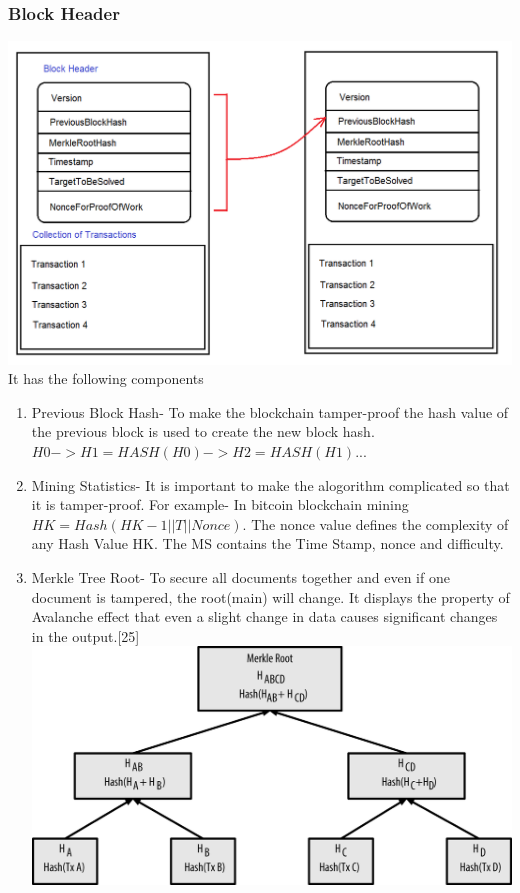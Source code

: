\documentclass{article}
\begin{document}
\subsubsection{Block Header}
\includegraphics[scale=0.25]{chained_blocks.png}
\\
It has the following components
\begin{enumerate}
   \item Previous Block Hash- To make the blockchain tamper-proof the hash value of the previous block is used to create the new block hash.\\ $ H0 -> H1= HASH(H0) -> H2= HASH(H1)... $
   \item Mining Statistics- It is important to make the alogorithm complicated so that it is tamper-proof. For example- In bitcoin blockchain mining $HK =Hash( HK-1||T ||Nonce)$. The nonce value defines the complexity of any Hash Value HK. The MS contains the Time Stamp, nonce and difficulty.
   \item Merkle Tree Root- To secure all documents together and even if one document is tampered, the root(main) will change. It displays the property of Avalanche effect that even a slight change in data causes significant changes in the output.[25]
   \\
  \includegraphics[scale=0.25]{Picture1.png}

\end{enumerate}
\end{document}
